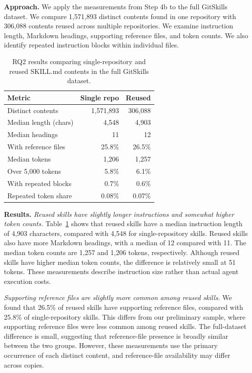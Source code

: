 \documentclass[sigconf,review]{acmart}
\begin{document}
\textbf{Approach.}
We apply the measurements from Step 4b to the full GitSkills
dataset. We compare 1{,}571{,}893 distinct contents found in one
repository with 306{,}088 contents reused across multiple
repositories. We examine instruction length, Markdown headings,
supporting reference files, and token counts. We also identify
repeated instruction blocks within individual files.

\begin{table}[t]
    \caption{RQ2 results comparing single-repository
    and reused SKILL.md contents in the full GitSkills dataset.}
    \label{tab:rq2-results}
    \centering
    \footnotesize
    \setlength{\tabcolsep}{3pt}
    \begin{tabular}{@{}p{}rr@{}}
        \toprule
        Metric & Single repo & Reused \\
        \midrule
        Distinct contents & 1,571,893 & 306,088 \\
        Median length (chars) & 4,548 & 4,903 \\
        Median headings & 11 & 12 \\
        With reference files & 25.8\% & 26.5\% \\
        Median tokens & 1,206 & 1,257 \\
        Over 5,000 tokens & 5.8\% & 6.1\% \\
        With repeated blocks & 0.7\% & 0.6\% \\
        Repeated token share & 0.08\% & 0.07\% \\
        \bottomrule
    \end{tabular}
\end{table}

\textbf{Results.}
\emph{Reused skills have slightly longer instructions and
somewhat higher token counts.}
Table~\ref{tab:rq2-results} shows that reused skills have a
median instruction length of 4,903 characters, compared with
4,548 for single-repository skills. Reused skills also have
more Markdown headings, with a median of 12 compared with 11.
The median token counts are 1,257 and 1,206 tokens,
respectively. Although reused skills have higher median
token counts, the difference is relatively small at 51 tokens.
These measurements describe instruction size rather than
actual agent execution costs.

\emph{Supporting reference files are slightly more common
among reused skills.}
We found that 26.5\% of reused skills have supporting reference
files, compared with 25.8\% of single-repository skills.
This differs from our preliminary sample, where supporting
reference files were less common among reused skills.
The full-dataset difference is small, suggesting that
reference-file presence is broadly similar between the two
groups. However, these measurements use the primary
occurrence of each distinct content, and reference-file
availability may differ across copies.
\end{document}
